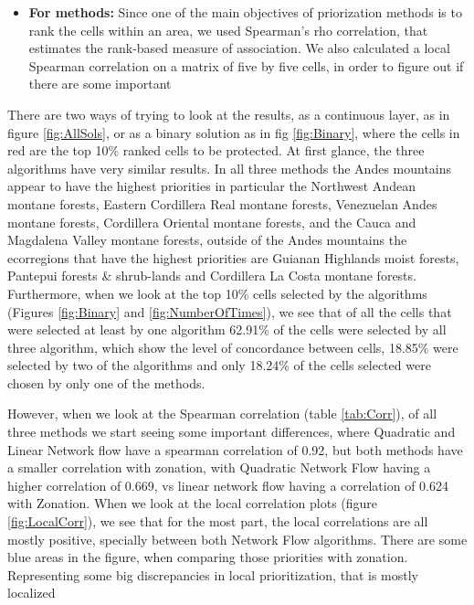 \documentclass[]{article}
\providecommand{\tightlist}{%
  \setlength{\itemsep}{0pt}\setlength{\parskip}{0pt}}
\begin{document}
\begin{itemize}
\tightlist
\item
  \textbf{For methods:} Since one of the main objectives of priorization methods is to rank the cells within an area, we used Spearman's rho correlation, that estimates the rank-based measure of association. We also calculated a local Spearman correlation on a matrix of five by five cells, in order to figure out if there are some important
\end{itemize}

There are two ways of trying to look at the results, as a continuous layer, as in figure \ref{fig:AllSols}, or as a binary solution as in fig \ref{fig:Binary}, where the cells in red are the top 10\% ranked cells to be protected. At first glance, the three algorithms have very similar results. In all three methods the Andes mountains appear to have the highest priorities in particular the Northwest Andean montane forests, Eastern Cordillera Real montane forests, Venezuelan Andes montane forests, Cordillera Oriental montane forests, and the Cauca and Magdalena Valley montane forests, outside of the Andes mountains the ecorregions that have the highest priorities are Guianan Highlands moist forests, Pantepui forests \& shrub-lands and Cordillera La Costa montane forests. Furthermore, when we look at the top 10\% cells selected by the algorithms (Figures \ref{fig:Binary} and \ref{fig:NumberOfTimes}), we see that of all the cells that were selected at least by one algorithm 62.91\% of the cells were selected by all three algorithm, which show the level of concordance between cells, 18.85\% were selected by two of the algorithms and only 18.24\% of the cells selected were chosen by only one of the methods.

However, when we look at the Spearman correlation (table \ref{tab:Corr}), of all three methods we start seeing some important differences, where Quadratic and Linear Network flow have a spearman correlation of 0.92, but both methods have a smaller correlation with zonation, with Quadratic Network Flow having a higher correlation of 0.669, vs linear network flow having a correlation of 0.624 with Zonation. When we look at the local correlation plots (figure \ref{fig:LocalCorr}), we see that for the most part, the local correlations are all mostly positive, specially between both Network Flow algorithms. There are some blue areas in the figure, when comparing those priorities with zonation. Representing some big discrepancies in local prioritization, that is mostly localized
\end{document}
